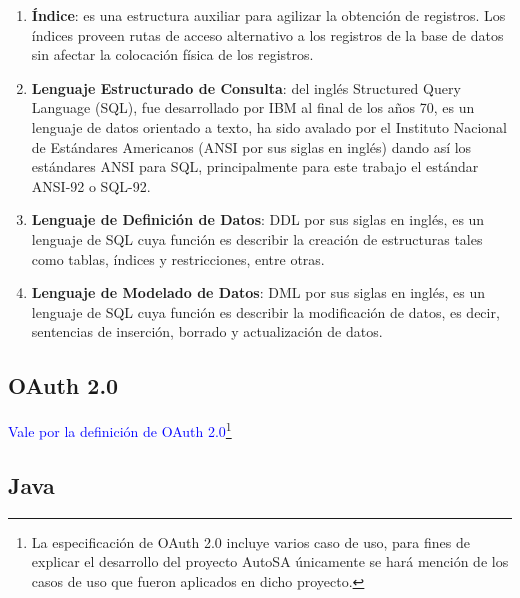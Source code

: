 \begin{enumerate}
\begin{enumerate}
	\end{enumerate}
	\item \textbf{Índice}: es una estructura auxiliar para agilizar la obtención de registros. Los índices proveen rutas de acceso alternativo a los registros de la base de datos sin afectar la colocación física de los registros\cite{FundamentalsOfDBSystems}.
	\item \textbf{Lenguaje Estructurado de Consulta}\label{sec-sql}: del inglés Structured Query Language (SQL), fue desarrollado por IBM\textsuperscript{\textcopyright} al final de los años 70, es un lenguaje de datos orientado a texto, ha sido avalado por el Instituto Nacional de Estándares Americanos (ANSI por sus siglas en inglés) dando así los estándares ANSI para SQL, principalmente para este trabajo el estándar ANSI-92 o SQL-92.
	\item \textbf{Lenguaje de Definición de Datos}: DDL por sus siglas en inglés, es un lenguaje de SQL cuya función es describir la creación de estructuras tales como tablas, índices y restricciones, entre otras\cite{DataBaseConcepts}.
	\item \textbf{Lenguaje de Modelado de Datos}: DML por sus siglas en inglés, es un lenguaje de SQL cuya función es describir la modificación de datos, es decir, sentencias de inserción, borrado y actualización de datos\cite{DataBaseConcepts}.  
\end{enumerate}

\subsection{OAuth 2.0}\label{sec-oauth}
\textcolor{blue}{Vale por la definición de OAuth 2.0}\footnote{La especificación de OAuth 2.0 incluye varios caso de uso, para fines de explicar el desarrollo del proyecto AutoSA únicamente se hará mención de los casos de uso que fueron aplicados en dicho proyecto.}

\subsection{Java}\label{sec-java}

